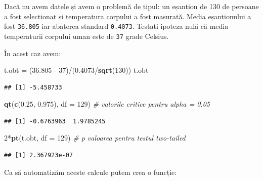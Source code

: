 \documentclass[]{article}
\newenvironment{Shaded}{\begin{snugshade}}{\end{snugshade}}
\newcommand{\KeywordTok}[1]{\textcolor[rgb]{0.13,0.29,0.53}{\textbf{{#1}}}}
\newcommand{\DataTypeTok}[1]{\textcolor[rgb]{0.13,0.29,0.53}{{#1}}}
\newcommand{\DecValTok}[1]{\textcolor[rgb]{0.00,0.00,0.81}{{#1}}}
\newcommand{\FloatTok}[1]{\textcolor[rgb]{0.00,0.00,0.81}{{#1}}}
\newcommand{\StringTok}[1]{\textcolor[rgb]{0.31,0.60,0.02}{{#1}}}
\newcommand{\CommentTok}[1]{\textcolor[rgb]{0.56,0.35,0.01}{\textit{{#1}}}}
\newcommand{\NormalTok}[1]{{#1}}
\begin{document}
Dacă nu avem datele și avem o problemă de tipul: un eșantion de 130 de
persoane a fost selectionat și temperatura corpului a fost masurată.
Media eșantionului a fost \texttt{36.805} iar abaterea standard
\texttt{0.4073}. Testati ipoteza nulă că media temperaturii corpului
uman este de \texttt{37} grade Celsius.

În acest caz avem:

\begin{Shaded}
\begin{Highlighting}[]
\NormalTok{t.obt =}\StringTok{ }\NormalTok{(}\FloatTok{36.805} \NormalTok{-}\StringTok{ }\DecValTok{37}\NormalTok{)/(}\FloatTok{0.4073}\NormalTok{/}\KeywordTok{sqrt}\NormalTok{(}\DecValTok{130}\NormalTok{))}
\NormalTok{t.obt}
\end{Highlighting}
\end{Shaded}

\begin{verbatim}
## [1] -5.458733
\end{verbatim}

\begin{Shaded}
\begin{Highlighting}[]
\KeywordTok{qt}\NormalTok{(}\KeywordTok{c}\NormalTok{(}\FloatTok{0.25}\NormalTok{, }\FloatTok{0.975}\NormalTok{), }\DataTypeTok{df =} \DecValTok{129}\NormalTok{) }\CommentTok{# valorile critice pentru alpha = 0.05}
\end{Highlighting}
\end{Shaded}

\begin{verbatim}
## [1] -0.6763963  1.9785245
\end{verbatim}

\begin{Shaded}
\begin{Highlighting}[]
\DecValTok{2}\NormalTok{*}\KeywordTok{pt}\NormalTok{(t.obt, }\DataTypeTok{df =} \DecValTok{129}\NormalTok{) }\CommentTok{# p valoarea pentru testul two-tailed}
\end{Highlighting}
\end{Shaded}

\begin{verbatim}
## [1] 2.367923e-07
\end{verbatim}

Ca să automatizăm aceste calcule putem crea o funcție:
\end{document}
